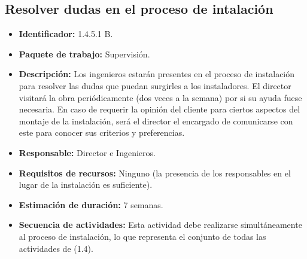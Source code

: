\subsection{Resolver dudas en el proceso de intalación}
\begin{itemize}
\item \textbf{Identificador: }1.4.5.1 B.
\item \textbf{Paquete de trabajo: }Supervisión.
\item \textbf{Descripción: }Los ingenieros estarán presentes en el proceso de instalación para resolver las dudas que puedan surgirles a los instaladores. El director visitará la obra periódicamente (dos veces a la semana) por si su ayuda fuese necesaria. En caso de requerir la opinión del cliente para ciertos aspectos del montaje de la instalación, será el director el encargado de comunicarse con este para conocer sus criterios y preferencias.
\item \textbf{Responsable: }Director e Ingenieros.
\item \textbf{Requisitos de recursos: }Ninguno (la presencia de los responsables en el lugar de la instalación es suficiente).
\item \textbf{Estimación de duración: }7 semanas.
\item \textbf{Secuencia de actividades: } Esta actividad debe realizarse simultáneamente al proceso de instalación, lo que representa el conjunto de todas las actividades de (1.4).
\end{itemize}

